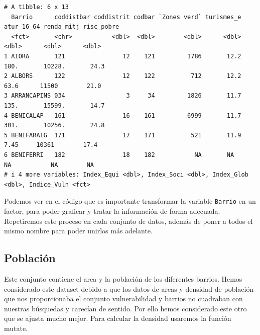 \documentclass[notspecified,article,submit,moreauthors,pdftex]{Definitions/mdpi}
\begin{document}
\begin{verbatim}
# A tibble: 6 x 13
  Barrio      coddistbar coddistrit codbar `Zones verd` turismes_e atur_16_64 renda_mitj risc_pobre
  <fct>       <chr>           <dbl>  <dbl>        <dbl>      <dbl>      <dbl>      <dbl>      <dbl>
1 AIORA       121                12    121         1786       12.2     180.       10228.       24.3
2 ALBORS      122                12    122          712       12.2      63.6      11500        21.0
3 ARRANCAPINS 034                 3     34         1826       11.7     135.       15599.       14.7
4 BENICALAP   161                16    161         6999       11.7     301.       10256.       24.8
5 BENIFARAIG  171                17    171          521       11.9       7.45     10361        17.4
6 BENIFERRI   182                18    182           NA       NA        NA           NA        NA  
# i 4 more variables: Index_Equi <dbl>, Index_Soci <dbl>, Index_Glob <dbl>, Indice_Vuln <fct>
\end{verbatim}

Podemos ver en el código que es importante transformar la variable
\texttt{Barrio} en un factor, para poder graficar y tratar la
información de forma adecuada. Repetiremos este proceso en cada conjunto
de datos, además de poner a todos el mismo nombre para poder unirlos más
adelante.

\hypertarget{poblaciuxf3n}{%
\subsection{Población}\label{poblaciuxf3n}}

Este conjunto contiene el area y la población de los diferentes barrios.
Hemos considerado este dataset debido a que los datos de areas y
densidad de población que nos proporcionaba el conjunto vulnerabilidad y
barrios no cuadraban con nuestras búsquedas y carecían de sentido. Por
ello hemos considerado este otro que se ajusta mucho mejor. Para
calcular la densidad usaremos la función mutate.
\end{document}
